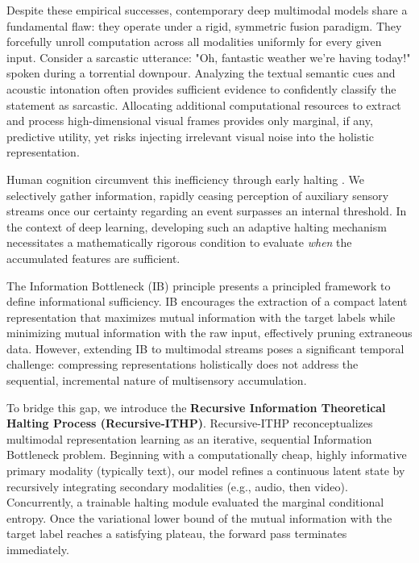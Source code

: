 \documentclass[11pt]{article}
\begin{document}
Despite these empirical successes, contemporary deep multimodal models share a fundamental flaw: they operate under a rigid, symmetric fusion paradigm. They forcefully unroll computation across all modalities uniformly for every given input. Consider a sarcastic utterance: "Oh, fantastic weather we're having today!" spoken during a torrential downpour. Analyzing the textual semantic cues and acoustic intonation often provides sufficient evidence to confidently classify the statement as sarcastic. Allocating additional computational resources to extract and process high-dimensional visual frames provides only marginal, if any, predictive utility, yet risks injecting irrelevant visual noise into the holistic representation.

Human cognition circumvent this inefficiency through early halting \citep{kahneman1973attention}. We selectively gather information, rapidly ceasing perception of auxiliary sensory streams once our certainty regarding an event surpasses an internal threshold. In the context of deep learning, developing such an adaptive halting mechanism necessitates a mathematically rigorous condition to evaluate \textit{when} the accumulated features are sufficient. 

The Information Bottleneck (IB) principle \citep{tishby1999information} presents a principled framework to define informational sufficiency. IB encourages the extraction of a compact latent representation that maximizes mutual information with the target labels while minimizing mutual information with the raw input, effectively pruning extraneous data. However, extending IB to multimodal streams poses a significant temporal challenge: compressing representations holistically does not address the sequential, incremental nature of multisensory accumulation.

To bridge this gap, we introduce the \textbf{Recursive Information Theoretical Halting Process (Recursive-ITHP)}. Recursive-ITHP reconceptualizes multimodal representation learning as an iterative, sequential Information Bottleneck problem. Beginning with a computationally cheap, highly informative primary modality (typically text), our model refines a continuous latent state by recursively integrating secondary modalities (e.g., audio, then video). Concurrently, a trainable halting module evaluated the marginal conditional entropy. Once the variational lower bound of the mutual information with the target label reaches a satisfying plateau, the forward pass terminates immediately.
\end{document}
